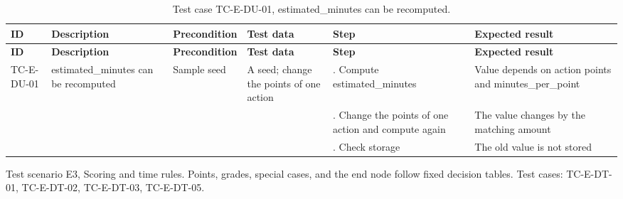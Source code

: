 {\footnotesize{}\renewcommand{\arraystretch}{1.1}
\begin{longtable}{|>{\raggedright\arraybackslash}p{}|>{\raggedright\arraybackslash}p{}|>{\raggedright\arraybackslash}p{}|>{\raggedright\arraybackslash}p{}|>{\raggedright\arraybackslash}p{}|>{\raggedright\arraybackslash}p{}|}
\caption{Test case TC-E-DU-01, estimated\_\allowbreak{}minutes can be recomputed.} \\
\hline
\textbf{ID} & \textbf{Description} & \textbf{Precondition} & \textbf{Test data} & \textbf{Step} & \textbf{Expected result} \\ \hline
\endfirsthead
\hline
\textbf{ID} & \textbf{Description} & \textbf{Precondition} & \textbf{Test data} & \textbf{Step} & \textbf{Expected result} \\ \hline
\endhead
TC-E-DU-01 & estimated\_\allowbreak{}minutes can be recomputed & Sample seed & A seed; change the points of one action & 1. Compute estimated\_\allowbreak{}minutes & Value depends on action points and minutes\_\allowbreak{}per\_\allowbreak{}point \\ \cline{5-6}
 &  &  &  & 2. Change the points of one action and compute again & The value changes by the matching amount \\ \cline{5-6}
 &  &  &  & 3. Check storage & The old value is not stored \\ \hline
\end{longtable}
}

Test scenario E3, Scoring and time rules. Points, grades, special cases, and the end node follow fixed decision tables. Test cases: TC-E-DT-01, TC-E-DT-02, TC-E-DT-03, TC-E-DT-05.

